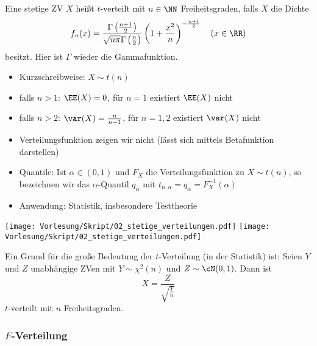 \documentclass{scrreprt}
\begin{document}
 Eine stetige ZV $X$ heißt $t$-verteilt mit $n\in \NN$ Freiheitsgraden, falls $X$ die Dichte 
\[ f_n(x)=\frac{\Gamma\left(\frac{n+1}{2}\right)}{\sqrt{n \pi}\Gamma\left(\frac{n}{2}\right)}\left(1+\frac{x^2}{n}\right)^{-\frac{n+1}{2}} \quad (x\in \RR) \]
besitzt. Hier ist $\Gamma$ wieder die Gammafunktion.

\begin{itemize}
	\item Kurzschreibweise: $X\sim t(n)$
	\item falls $n>1$: $\EE(X)=0$, für $n=1$ existiert $\EE(X)$ nicht
	\item falls $n>2$: $\var(X)=\frac{n}{n-1}$, für $n=1,2$ existiert $\var(X)$ nicht
	\item Verteilungsfunktion zeigen wir nicht (lässt sich mittels Betafunktion darstellen)
	\item Quantile: Ist $\alpha \in (0,1)$ und $F_X$ die Verteilungsfunktion zu $X\sim t(n)$, so bezeichnen wir das $\alpha$-Quantil $q_\alpha$ mit $t_{n,\alpha}=q_\alpha=F_{X}^{-1}(\alpha)$
	\item Anwendung: Statistik, insbesondere Testtheorie
\end{itemize}

\begin{center}
\texttt{[image: Vorlesung/Skript/02\_stetige\_verteilungen.pdf]}
\texttt{[image: Vorlesung/Skript/02\_stetige\_verteilungen.pdf]}
\end{center}

Ein Grund für die große Bedeutung der $ t $-Verteilung (in der Statistik) ist:
 Seien $ Y $ und $ Z $ unabhängige ZVen mit $ Y\sim \chi^{2} (n) $ und $ Z \sim \cN(0,1) $. Dann ist 
\[ X=\frac{Z}{\sqrt{\frac{Y}{n}}} \]
$ t $-verteilt mit $ n $ Freiheitsgraden.

\subsubsection{\texorpdfstring{$ F $}{F}-Verteilung}
\end{document}
